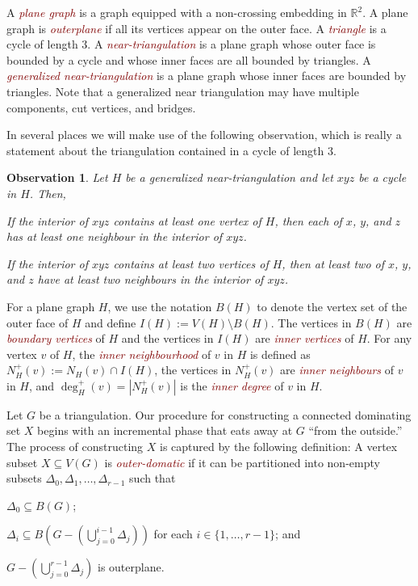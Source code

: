 \documentclass[11pt]{article}
\newtheorem{obs}{Observation}
\newcommand{\defin}[1]{\emph{\textcolor{Maroon}{#1}}}
\theoremstyle{definition}
\begin{document}
A \defin{plane graph} is a graph equipped with a non-crossing embedding in $\mathbb{R}^2$.  A plane graph is \defin{outerplane} if all its vertices appear on the outer face.  A \defin{triangle} is a cycle of length $3$. A \defin{near-triangulation} is a plane graph whose outer face is bounded by a cycle and whose inner faces are all bounded by triangles.  A \defin{generalized near-triangulation} is a plane graph whose inner faces are bounded by triangles. Note that a generalized near triangulation may have multiple components, cut vertices, and bridges.

In several places we will make use of the following observation, which is really a statement about the triangulation contained in a cycle of length $3$.
\begin{obs}\label{useful_little_guy}
  Let $H$ be a generalized near-triangulation and let $xyz$ be a cycle in $H$.  Then,
  \begin{compactenum}
    \item If the interior of $xyz$ contains at least one vertex of $H$, then each of $x$, $y$, and $z$ has at least one neighbour in the interior of $xyz$.

    \item If the interior of $xyz$ contains at least two vertices of $H$, then at least two of $x$, $y$, and $z$ have at least two neighbours in the interior of $xyz$.
  \end{compactenum}
\end{obs}

For a plane graph $H$, we use the notation $B(H)$ to denote the vertex set of the outer face of $H$ and define $I(H):=V(H)\setminus B(H)$.  The vertices in $B(H)$ are \defin{boundary vertices} of $H$ and the vertices in $I(H)$ are \defin{inner vertices} of $H$. For any vertex $v$ of $H$, the \defin{inner neighbourhood} of $v$ in $H$ is defined as $N_H^+(v):=N_H(v)\cap I(H)$, the vertices in $N^+_H(v)$ are \defin{inner neighbours} of $v$ in $H$, and $\deg^+_H(v)=|N^+_H(v)|$ is the \defin{inner degree} of $v$ in $H$.

Let $G$ be a triangulation.  Our procedure for constructing a connected dominating set $X$ begins with an incremental phase that eats away at $G$ ``from the outside.'' The process of constructing $X$ is captured by the following definition:   A vertex subset $X\subseteq V(G)$ is \defin{outer-domatic} if it can be partitioned into non-empty subsets $\Delta_0,\Delta_1,\ldots,\Delta_{r-1}$ such that
\begin{compactenum}[(P1)]
    \item $\Delta_0\subseteq B(G)$; \label{outer_face}
    \item $\Delta_i\subseteq B(G-(\bigcup_{j=0}^{i-1}\Delta_j))$ for each $i\in\{1,\ldots,r-1\}$; and \label{incremental}
    \item $G-(\bigcup_{j=0}^{r-1}\Delta_j)$ is outerplane. \label{outerplanar}
\end{compactenum}
\end{document}
